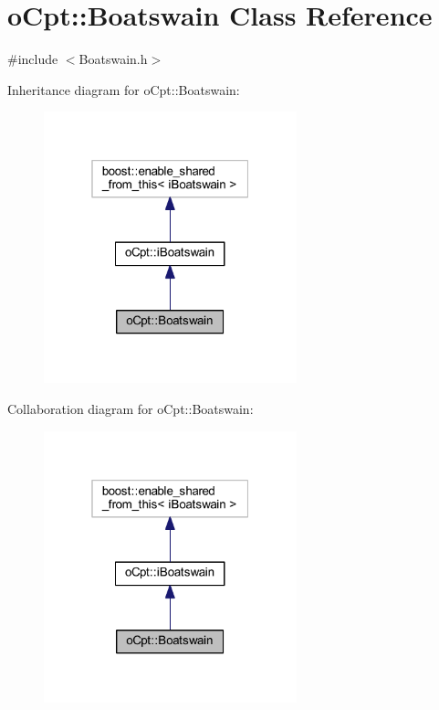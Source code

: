 \hypertarget{classo_cpt_1_1_boatswain}{}\section{o\+Cpt\+:\+:Boatswain Class Reference}
\label{classo_cpt_1_1_boatswain}


{\ttfamily \#include $<$Boatswain.\+h$>$}



Inheritance diagram for o\+Cpt\+:\+:Boatswain\+:\nopagebreak
\begin{figure}[H]
\begin{center}
\leavevmode
\includegraphics[width=208pt]{classo_cpt_1_1_boatswain__inherit__graph}
\end{center}
\end{figure}


Collaboration diagram for o\+Cpt\+:\+:Boatswain\+:\nopagebreak
\begin{figure}[H]
\begin{center}
\leavevmode
\includegraphics[width=208pt]{classo_cpt_1_1_boatswain__coll__graph}
\end{center}
\end{figure}
